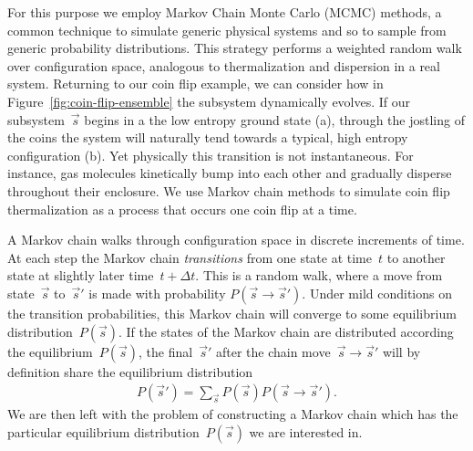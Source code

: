For this purpose we employ Markov Chain Monte Carlo (MCMC) methods, a common technique to simulate generic physical systems and so to sample from generic probability distributions. This strategy performs a weighted random walk over configuration space, analogous to thermalization and dispersion in a real system. Returning to our coin flip example, we can consider how in Figure~\ref{fig:coin-flip-ensemble} the subsystem dynamically evolves. If our subsystem~$\vec{s}$ begins in a the low entropy ground state (a), through the jostling of the coins the system will naturally tend towards a typical, high entropy configuration (b). Yet physically this transition is not instantaneous. For instance, gas molecules kinetically bump into each other and gradually disperse throughout their enclosure. We use Markov chain methods to simulate coin flip thermalization as a process that occurs one coin flip at a time. 

A Markov chain walks through configuration space in discrete increments of time. At each step the Markov chain \emph{transitions} from one state at time~$t$ to another state at slightly later time~$t + \Delta t$. This is a random walk, where a move from state~$\vec{s}$ to~$\vec{s}'$ is made with probability $P(\vec{s} \rightarrow \vec{s}')$. Under mild conditions on the transition probabilities, this Markov chain will converge to some equilibrium distribution~$P(\vec{s})$. If the states of the Markov chain are distributed according the equilibrium~$P(\vec{s})$, the final~$\vec{s}'$ after the chain move~$\vec{s} \rightarrow \vec{s}'$ will by definition share the equilibrium distribution \begin{align}
    P(\vec{s}') = \sum_{\vec{s}}P(\vec{s})P(\vec{s} \rightarrow \vec{s}'). \label{eq:MCMC-stability}
\end{align}
We are then left with the problem of constructing a Markov chain which has the particular equilibrium distribution~$P(\vec{s})$ we are interested in.

